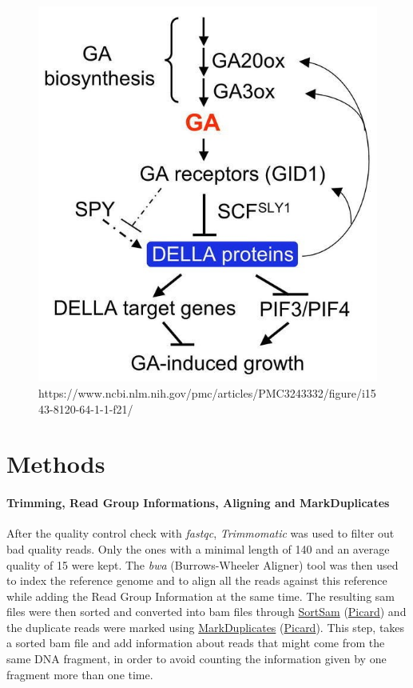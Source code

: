 \documentclass[10pt,a4paper]{article}
\begin{document}
\begin{figure}[H]
	\centering
	\includegraphics[width=0.4\linewidth]{img/GASPYpathway}
	\caption[GAI and SPY pathways]{https://www.ncbi.nlm.nih.gov/pmc/articles/PMC3243332/figure/i1543-8120-64-1-1-f21/}
	\label{fig:gaspypathway}
\end{figure}


\section*{Methods} 

\paragraph{Trimming, Read Group Informations, Aligning and MarkDuplicates} After the quality control check with \textit{fastqc}\cite{andrews2012}, \textit{Trimmomatic}\cite{bolger_trimmomatic:_2014} was used to filter out bad quality reads. Only the ones with a minimal length of 140 and an average quality of 15 were kept. The \textit{bwa} (Burrows-Wheeler Aligner) tool was then used to index the reference genome
and to align all the reads against this reference while adding the Read Group Information at the same time. The resulting sam files were then sorted and converted into bam files through  \href{https://software.broadinstitute.org/gatk/documentation/tooldocs/4.0.8.0/picard_sam_SortSam.php}{SortSam} (\href{https://broadinstitute.github.io/picard/}{Picard}) and the duplicate reads were marked using  \href{https://software.broadinstitute.org/gatk/documentation/tooldocs/4.0.4.0/picard_sam_markduplicates_MarkDuplicates.php}{MarkDuplicates} (\href{https://broadinstitute.github.io/picard/}{Picard}). This step, takes a sorted bam file and  add information about reads that might come from the same DNA fragment, in order to avoid counting the information given by one fragment more than one time. 
\end{document}
